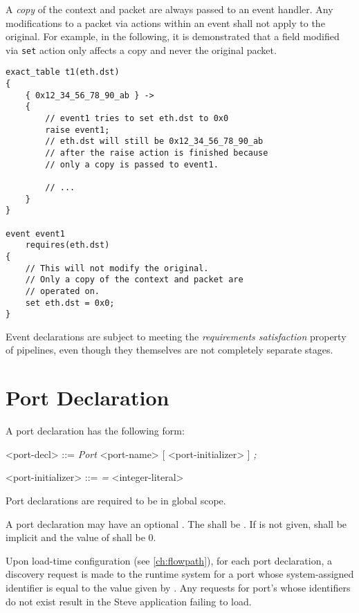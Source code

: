 A \textit{copy} of the context  and packet are always passed to an event handler. Any modifications to a packet via actions within an event shall not apply to the original. For example, in the following, it is demonstrated that a field modified via \texttt{set} action only affects a copy and never the original packet.

\begin{minip}
\begin{lstlisting}
exact_table t1(eth.dst)
{
	{ 0x12_34_56_78_90_ab } ->
	{
		// event1 tries to set eth.dst to 0x0
		raise event1;
		// eth.dst will still be 0x12_34_56_78_90_ab
		// after the raise action is finished because
		// only a copy is passed to event1.
		
		// ...
	}
}

event event1
	requires(eth.dst)
{
	// This will not modify the original.
	// Only a copy of the context and packet are
	// operated on.
	set eth.dst = 0x0;
}
\end{lstlisting}
\end{minip}

Event declarations are subject to meeting the \textit{requirements satisfaction} property of pipelines, even though they themselves are not completely separate stages.

\section{Port Declaration} \label{guide:port}

A port declaration has the following form:

\begin{minip}
\begin{grammar}
<port-decl> ::=
\textit{Port} <port-name> [ <port-initializer> ] \textit{;}

<port-initializer> ::= \textit{=} <integer-literal>
\end{grammar}
\end{minip}

Port declarations are required to be in global scope.

A port declaration may have an optional . The  shall be . If  is not given,  shall be implicit and the value of  shall be 0.

Upon load-time configuration (see \ref{ch:flowpath}), for each port declaration, a discovery request is made to the runtime system for a port whose system-assigned identifier is equal to the value given by . Any requests for port's whose identifiers do not exist result in the Steve application failing to load.


